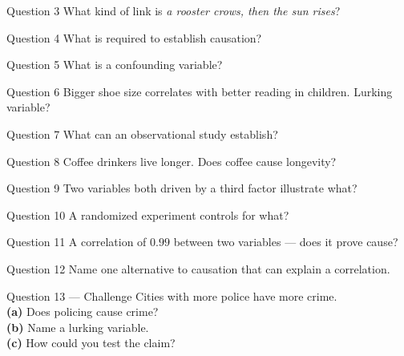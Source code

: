 \documentclass[11pt]{article}
\begin{document}
\begin{qbox}{Question 3}
What kind of link is \emph{a rooster crows, then the sun rises}?\workspace{2.4cm}
\end{qbox}

\begin{qbox}{Question 4}
What is required to establish causation?\workspace{2.4cm}
\end{qbox}

\begin{qbox}{Question 5}
What is a confounding variable?\workspace{2.4cm}
\end{qbox}

\begin{qbox}{Question 6}
Bigger shoe size correlates with better reading in children. Lurking variable?\workspace{2.4cm}
\end{qbox}

\begin{qbox}{Question 7}
What can an observational study establish?\workspace{2.4cm}
\end{qbox}

\begin{qbox}{Question 8}
Coffee drinkers live longer. Does coffee cause longevity?\workspace{2.4cm}
\end{qbox}

\begin{qbox}{Question 9}
Two variables both driven by a third factor illustrate what?\workspace{2.4cm}
\end{qbox}

\begin{qbox}{Question 10}
A randomized experiment controls for what?\workspace{2.4cm}
\end{qbox}

\begin{qbox}{Question 11}
A correlation of $0.99$ between two variables --- does it prove cause?\workspace{2.4cm}
\end{qbox}

\begin{qbox}{Question 12}
Name one alternative to causation that can explain a correlation.\workspace{2.4cm}
\end{qbox}

\begin{qbox}{Question 13 --- Challenge}
Cities with more police have more crime. \\ \textbf{(a)} Does policing cause crime? \\ \textbf{(b)} Name a lurking variable. \\ \textbf{(c)} How could you test the claim?\workspace{3cm}
\end{qbox}
\end{document}
